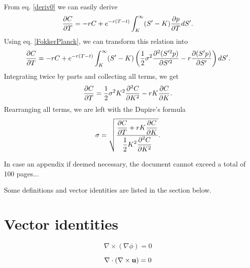 From eq. \ref{deriv0} we can easily derive
\begin{equation}
\pdv{C}{T}=-rC+e^{-r(T-t)}\int_K^\infty(S'-K)\pdv{p}{T}dS'.
\end{equation}
Using eq. \ref{FokkerPlanck}, we can transform this relation into
\begin{equation}
\pdv{C}{T}=-rC+e^{-r(T-t)}\int_K^\infty(S'-K)\left(\frac{1}{2}\sigma^2\pdv{^2(S'^2p)}{S'^2}-r\pdv{(S'p)}{S'}\right)dS'.
\end{equation}
Integrating twice by parts and collecting all terms, we get
\begin{equation}
\pdv{C}{T}=\frac{1}{2}\sigma^2K^2\pdv{^2C}{K^2}-rK\pdv{C}{K}.
\end{equation}
Rearranging all terms, we are left with the Dupire's formula
\begin{equation}
\sigma=\sqrt{\frac{\displaystyle\pdv{C}{T}+rK\pdv{C}{K}}{\displaystyle\frac{1}{2}K^2\pdv{^2C}{K^2}}}.
\end{equation}

\pagebreak
In case an appendix if deemed necessary, the document cannot exceed a total of 100 pages...

Some definitions and vector identities are listed in the section below.

\section{Vector identities}
\label{section:vectorIdentities}

\begin{equation}
	\nabla \times \left( \nabla \phi \right) = 0
	\label{eq:cross_nnp}
\end{equation}

\begin{equation}
	\nabla \cdot \left( \nabla \times {\bf u} \right) = 0
	\label{eq:dotCross_nnu}
\end{equation}

